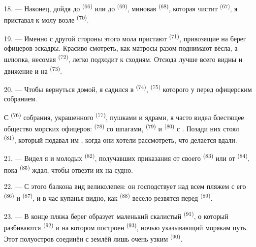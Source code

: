 18. --- Наконец, дойдя до  \textsuperscript{(66)} или до
 \textsuperscript{(69)}, миновав 
\textsuperscript{(68)}, которая чистит  \textsuperscript{(67)}, я
приставал к молу возле  \textsuperscript{(70)}.

19. --- Именно с другой стороны этого мола пристают 
\textsuperscript{(71)}, привозящие на берег офицеров эскадры. Красиво смотреть,
как матросы разом поднимают вёсла, а шлюпка, несомая 
\textsuperscript{(72)}, легко подходит к сходням. Отсюда лучше всего видны
 и движение  и  на
 \textsuperscript{(73)}.

\VUsaut{3.0mm}
\VUsaut{3.0mm}

20. --- Чтобы вернуться домой, я садился в 
\textsuperscript{(74)},  \textsuperscript{(75)} которого у
 перед офицерским собранием.

С  \textsuperscript{(76)} собрания, украшенного 
\textsuperscript{(77)}, пушками и ядрами, я часто видел блестящее общество
морских офицеров:  \textsuperscript{(78)} со шпагами,
 \textsuperscript{(79)} и 
\textsuperscript{(80)} с . Позади них стоял 
\textsuperscript{(81)}, который подавал им , когда они
хотели рассмотреть, что делается вдали.

21. --- Видел я и молодых  \textsuperscript{(82)}, получавших
приказания от своего  \textsuperscript{(83)} или от
 \textsuperscript{(84)}, пока 
\textsuperscript{(85)} ждал, чтобы отвезти их на судно.

22. --- С этого балкона вид великолепен: он господствует над всем пляжем
с его  \textsuperscript{(86)} и 
\textsuperscript{(87)}, и в час купанья видно, как 
\textsuperscript{(88)} весело резвятся перед  \textsuperscript{(89)}.

23. --- В конце пляжа берег образует маленький скалистый 
\textsuperscript{(91)}, о который разбиваются  \textsuperscript{(92)} и
на котором построен  \textsuperscript{(93)}, ночью указывающий
морякам путь. Этот полуостров соединён с землёй лишь очень узким
 \textsuperscript{(90)}.

